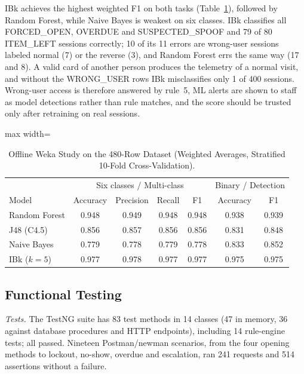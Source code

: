 \documentclass[sigconf,screen]{acmart}
\begin{document}
IBk achieves the highest weighted F1 on both tasks (Table~\ref{tab:ml}), followed by Random Forest, while Naive Bayes
is weakest on six classes. IBk classifies all FORCED\_OPEN, OVERDUE and SUSPECTED\_SPOOF and 79 of 80 ITEM\_LEFT
sessions correctly; 10 of its 11 errors are wrong-user sessions labeled normal (7) or the reverse (3), and Random
Forest errs the same way (17 and 8). A valid card of another person produces the telemetry of a normal visit, and
without the WRONG\_USER rows IBk misclassifies only 1 of 400 sessions. Wrong-user access is therefore answered by
rule~5, ML alerts are shown to staff as model detections rather than rule matches, and the score should be trusted
only after retraining on real sessions.

\begin{table}[tbp]
\centering
\small
\caption{Offline Weka Study on the 480-Row Dataset (Weighted Averages, Stratified 10-Fold Cross-Validation).}
\label{tab:ml}
\begin{adjustbox}{max width=\columnwidth}
\begin{tabular}{l c c c c c c}
\toprule
 & \multicolumn{4}{c}{Six classes / Multi-class} & \multicolumn{2}{c}{Binary / Detection} \\
Model & Accuracy & Precision & Recall & F1 & Accuracy & F1 \\
\midrule
Random Forest & 0.948 & 0.949 & 0.948 & 0.948 & 0.938 & 0.939 \\
J48 (C4.5)    & 0.856 & 0.857 & 0.856 & 0.856 & 0.831 & 0.848 \\
Naive Bayes   & 0.779 & 0.778 & 0.779 & 0.778 & 0.833 & 0.852 \\
IBk ($k=5$)   & 0.977 & 0.978 & 0.977 & 0.977 & 0.975 & 0.975 \\
\bottomrule
\end{tabular}
\end{adjustbox}
\end{table}

\subsection{Functional Testing}\label{sec:functional}

\textit{Tests.} The TestNG suite has 83 test methods in 14 classes (47 in memory, 36 against database procedures and
HTTP endpoints), including 14 rule-engine tests; all passed. Nineteen Postman/newman scenarios, from
the four opening methods to lockout, no-show, overdue and escalation, ran 241 requests and 514 assertions without a
failure.
\end{document}

